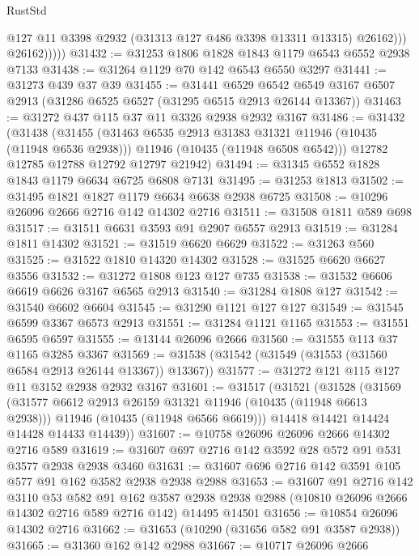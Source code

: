\begin{lexlean}{RustStd}
\begin{coremodule}
                    @127
                    @11
                    @3398
                    @2932
                    (@31313 @127 @486 @3398 @13311 @13315)
                    @26162)))
              @26162)))))
@31432 := @31253 @1806 @1828 @1843 @1179 @6543 @6552 @2938 @7133
@31438 := @31264 @1129 @70 @142 @6543 @6550 @3297
@31441 := @31273 @439 @37 @39
@31455 := @31441
    @6529
    @6542
    @6549
    @3167
    @6507
    @2913
    (@31286 @6525 @6527 (@31295 @6515 @2913 @26144 @13367))
@31463 := @31272 @437 @115 @37 @11 @3326 @2938 @2932 @3167
@31486 := @31432
    (@31438
      (@31455
        (@31463 @6535 @2913 @31383 @31321 @11946 (@10435 (@11948 @6536 @2938)))
        @11946
        (@10435 (@11948 @6508 @6542)))
      @12782
      @12785
      @12788
      @12792
      @12797
      @21942)
@31494 := @31345 @6552 @1828 @1843 @1179 @6634 @6725 @6808 @7131
@31495 := @31253 @1813
@31502 := @31495 @1821 @1827 @1179 @6634 @6638 @2938 @6725
@31508 := @10296 @26096 @2666 @2716 @142 @14302 @2716
@31511 := @31508 @1811 @589 @698
@31517 := @31511 @6631 @3593 @91 @2907 @6557 @2913
@31519 := @31284 @1811 @14302
@31521 := @31519 @6620 @6629
@31522 := @31263 @560
@31525 := @31522 @1810 @14320 @14302
@31528 := @31525 @6620 @6627 @3556
@31532 := @31272 @1808 @123 @127 @735
@31538 := @31532 @6606 @6619 @6626 @3167 @6565 @2913
@31540 := @31284 @1808 @127
@31542 := @31540 @6602 @6604
@31545 := @31290 @1121 @127 @127
@31549 := @31545 @6599 @3367 @6573 @2913
@31551 := @31284 @1121 @1165
@31553 := @31551 @6595 @6597
@31555 := @13144 @26096 @2666
@31560 := @31555 @113 @37 @1165 @3285 @3367
@31569 := @31538 (@31542 (@31549 (@31553 (@31560 @6584 @2913 @26144 @13367)) @13367))
@31577 := @31272 @121 @115 @127 @11 @3152 @2938 @2932 @3167
@31601 := @31517
    (@31521
      (@31528
        (@31569
          (@31577 @6612 @2913 @26159 @31321 @11946 (@10435 (@11948 @6613 @2938)))
          @11946
          (@10435 (@11948 @6566 @6619)))
        @14418
        @14421
        @14424
        @14428
        @14433
        @14439))
@31607 := @10758 @26096 @26096 @2666 @14302 @2716 @589
@31619 := @31607 @697 @2716 @142 @3592 @28 @572 @91 @531 @3577 @2938 @2938 @3460
@31631 := @31607 @696 @2716 @142 @3591 @105 @577 @91 @162 @3582 @2938 @2938 @2988
@31653 := @31607
    @91
    @2716
    @142
    @3110
    @53
    @582
    @91
    @162
    @3587
    @2938
    @2938
    @2988
    (@10810 @26096 @2666 @14302 @2716 @589 @2716 @142)
    @14495
    @14501
@31656 := @10854 @26096 @14302 @2716
@31662 := @31653 (@10290 (@31656 @582 @91 @3587 @2938))
@31665 := @31360 @162 @142 @2988
@31667 := @10717 @26096 @2666

\end{coremodule}
\end{lexlean}
